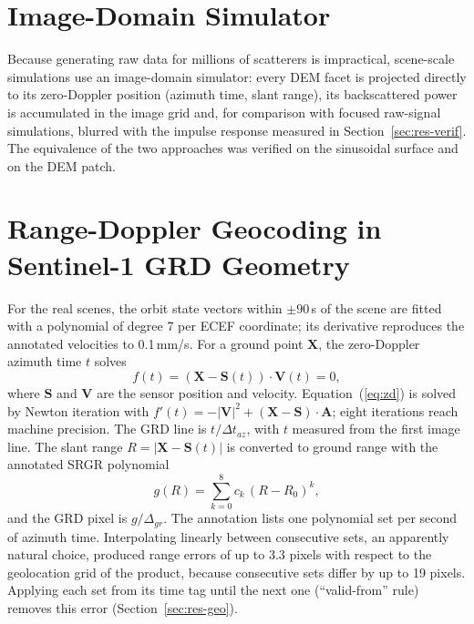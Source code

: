 \section{Image-Domain Simulator}
Because generating raw data for millions of scatterers is impractical, scene-scale simulations use an image-domain simulator: every DEM facet is projected directly to its zero-Doppler position (azimuth time, slant range), its backscattered power is accumulated in the image grid and, for comparison with focused raw-signal simulations, blurred with the impulse response measured in Section~\ref{sec:res-verif}. The equivalence of the two approaches was verified on the sinusoidal surface and on the DEM patch.

\section{Range-Doppler Geocoding in Sentinel-1 GRD Geometry}
For the real scenes, the orbit state vectors within $\pm90$\,s of the scene are fitted with a polynomial of degree 7 per ECEF coordinate; its derivative reproduces the annotated velocities to 0.1\,mm/s. For a ground point $\mathbf{X}$, the zero-Doppler azimuth time $t$ solves
\begin{equation}
f(t)=\left(\mathbf{X}-\mathbf{S}(t)\right)\cdot\mathbf{V}(t)=0,
\label{eq:zd}
\end{equation}
where $\mathbf{S}$ and $\mathbf{V}$ are the sensor position and velocity. Equation~(\ref{eq:zd}) is solved by Newton iteration with $f'(t)=-|\mathbf{V}|^2+(\mathbf{X}-\mathbf{S})\cdot\mathbf{A}$; eight iterations reach machine precision. The GRD line is $t/\Delta t_{az}$, with $t$ measured from the first image line. The slant range $R=|\mathbf{X}-\mathbf{S}(t)|$ is converted to ground range with the annotated SRGR polynomial
\begin{equation}
g(R)=\sum_{k=0}^{8}c_k\,(R-R_0)^k ,
\end{equation}
and the GRD pixel is $g/\Delta_{gr}$. The annotation lists one polynomial set per second of azimuth time. Interpolating linearly between consecutive sets, an apparently natural choice, produced range errors of up to 3.3 pixels with respect to the geolocation grid of the product, because consecutive sets differ by up to 19 pixels. Applying each set from its time tag until the next one (``valid-from'' rule) removes this error (Section~\ref{sec:res-geo}).


